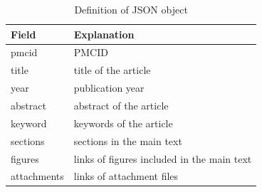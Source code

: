 \begin{table}[h]
    \centering
    \caption{Definition of JSON object}
    \label{tab:json}
    \begin{tabular}{l l}
    \hline
    Field   &   Explanation \\
    \hline
    pmcid  &  PMCID \\
    title   &   title of the article \\
    year    &   publication year \\
    abstract    &   abstract of the article \\
    keyword &   keywords of the article \\
    sections    &   sections in the main text \\
    figures & links of figures included in the main text\\
    attachments & links of attachment files\\
    \hline
    \end{tabular}
\end{table}